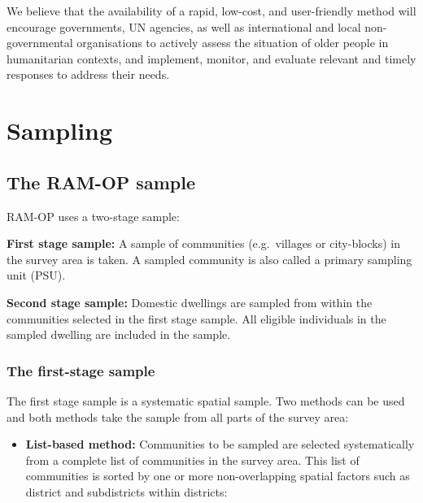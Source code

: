 \documentclass[12pt,a4paper]{book}
\providecommand{\tightlist}{%
  \setlength{\itemsep}{0pt}\setlength{\parskip}{0pt}}
\theoremstyle{definition}
\theoremstyle{definition}
\theoremstyle{definition}
\theoremstyle{remark}
\begin{document}
We believe that the availability of a rapid, low-cost, and user-friendly
method will encourage governments, UN agencies, as well as international
and local non-governmental organisations to actively assess the
situation of older people in humanitarian contexts, and implement,
monitor, and evaluate relevant and timely responses to address their
needs.

\hypertarget{sampling}{%
\chapter{Sampling}\label{sampling}}

\hypertarget{the-ram-op-sample}{%
\section{The RAM-OP sample}\label{the-ram-op-sample}}

RAM-OP uses a two-stage sample:

\textbf{First stage sample:} A sample of communities (e.g.~villages or
city-blocks) in the survey area is taken. A sampled community is also
called a primary sampling unit (PSU).

\textbf{Second stage sample:} Domestic dwellings are sampled from within
the communities selected in the first stage sample. All eligible
individuals in the sampled dwelling are included in the sample.

\hypertarget{the-first-stage-sample}{%
\subsection{The first-stage sample}\label{the-first-stage-sample}}

The first stage sample is a systematic spatial sample. Two methods can
be used and both methods take the sample from all parts of the survey
area:

\begin{itemize}
\tightlist
\item
  \textbf{List-based method:} Communities to be sampled are selected
  systematically from a complete list of communities in the survey area.
  This list of communities is sorted by one or more non-overlapping
  spatial factors such as district and subdistricts within districts:
\end{itemize}
\end{document}
